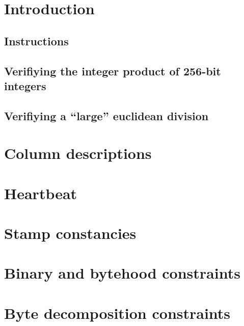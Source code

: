 \section{Introduction}                                          \label{ext: intro}
\subsection{Instructions}                                       \label{ext: intro: instructions}                          
\subsection{Verifiying the integer product of 256-bit integers} \label{ext: intro: integer product of 256-bit integers}   
\subsection{Verifiying a ``large'' euclidean division}          \label{ext: intro: large euclidean divisions}             
\section{Column descriptions}                                   \label{ext: columns}                                      
\section{Heartbeat}                                             \label{ext: heartbeat}                                    
\section{Stamp constancies}                                     \label{ext: constancies}                                  
\section{Binary and bytehood constraints}                       \label{ext: binary and bytehood constraints}              
\section{Byte decomposition constraints}                        \label{ext: byte decompositions}                          

